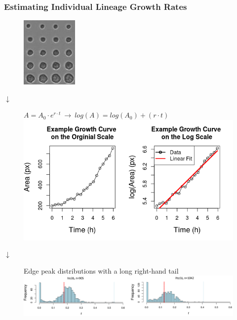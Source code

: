 \documentclass{beamer}
\begin{document}
\begin{frame}
\frametitle{Estimating Individual Lineage Growth Rates}
\centering
\vspace{-0.5em}
\begin{figure}
\includegraphics[width=0.08\linewidth]{FolderR08C08_Blob0014_TimeCourse.jpg}
\end{figure}
\vspace{-1em}
$\downarrow$
\vspace{-0.2em}
\begin{figure}
\tiny{$A=A_{0}\cdot e^{r\cdot t} \> \rightarrow \> log(A)=log(A_{0})+(r\cdot t)$ }\\
\includegraphics[width=0.45\linewidth]{ExampleGCPres.png}
\end{figure}
\vspace{-1em}
$\downarrow$
\vspace{-0.5em}
\begin{figure}
Edge peak distributions with a long right-hand tail
\includegraphics[width=0.9\linewidth]{GrowthRateDistr.png}
\end{figure}
\end{frame}
\end{document}
